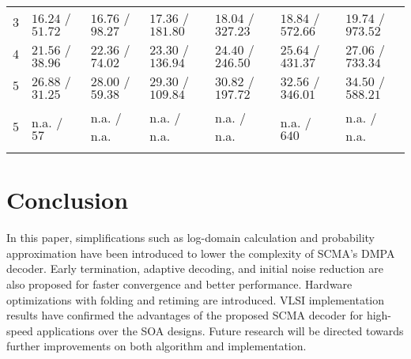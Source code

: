\documentclass[journal,twoside]{IEEEtran}
\begin{document}
\begin{table*}[htbp]
\begin{tabular}{lllllll}
\rowcolor{gray!15}$3$ & $16.24$ / $51.72$ & $16.76$ / $98.27$ & $17.36$ / $181.80$ & $18.04$ / $327.23$ & $18.84$ / $572.66$ & $19.74$ / $973.52$\\
$4$ & $21.56$ / $38.96$ & $22.36$ / $74.02$ & $23.30$ / $136.94$ & $24.40$ / $246.50$ & $25.64$ / $431.37$ & $27.06$ / $733.34$\\
\rowcolor{gray!15}$5$ & $26.88$ / $31.25$ & $28.00$ / $59.38$ & $29.30$ / $109.84$ & $30.82$ / $197.72$ & $32.56$ / $346.01$ & $34.50$ / $588.21$\\
\Xhline{.5pt}
\multicolumn{7}{c}{K. Han \cite{SMPA_2}, [SMPA decoder, TCAS-I Oct. '17]}\\
\Xhline{.5pt}
$5$ & n.a. / $57$ & n.a. / n.a. & n.a. / n.a. & n.a. / n.a. & n.a. / $640$  & n.a. / n.a. \\
\Xhline{1.0pt}
\end{tabular}
\end{table*}

\section{Conclusion}\label{sec:Conclusion}
In this paper, simplifications such as log-domain calculation and probability approximation have been introduced to lower the complexity of SCMA's DMPA decoder. Early termination, adaptive decoding, and initial noise reduction are also proposed for faster convergence and better performance.
Hardware optimizations with folding and retiming are introduced. VLSI implementation results have confirmed the advantages of the proposed SCMA decoder for high-speed applications over the SOA designs. Future research will be directed towards further improvements on both algorithm and implementation.
\end{document}
